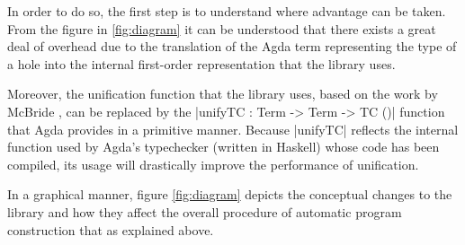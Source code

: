 \documentclass[a4paper]{article}
\begin{document}
In order to do so, the first step is to understand where advantage can be taken.
From the figure in \ref{fig:diagram} it can be understood that there exists a great
deal of overhead due to the translation of the Agda term representing the type
of a hole into the internal first-order representation that the library uses.

Moreover, the unification function that the library uses, based on the work by
McBride \cite{McBride2003FirstorderUB}, can be replaced by the |unifyTC :
Term -> Term -> TC ()| function that Agda provides in a primitive manner.
Because |unifyTC| reflects the internal function used by Agda's typechecker
(written in Haskell) whose code has been compiled, its usage will drastically
improve the performance of unification.

In a graphical manner, figure \ref{fig:diagram} depicts the conceptual changes
to the library and how they affect the overall procedure of automatic program
construction that as explained above.
\end{document}
